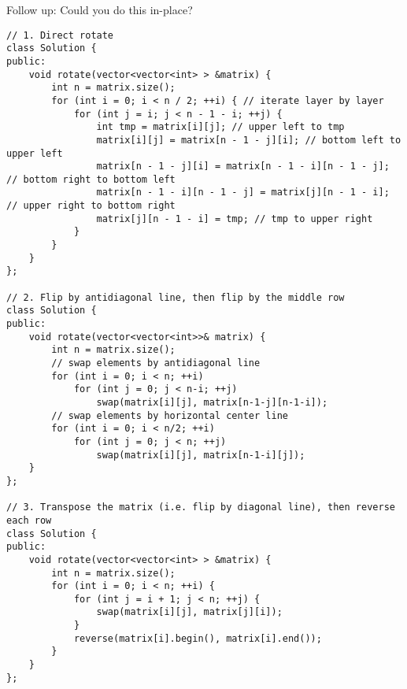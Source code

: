 Follow up: Could you do this in-place?\\

\begin{lstlisting}
// 1. Direct rotate
class Solution {
public:
    void rotate(vector<vector<int> > &matrix) {
        int n = matrix.size();
        for (int i = 0; i < n / 2; ++i) { // iterate layer by layer
            for (int j = i; j < n - 1 - i; ++j) {
                int tmp = matrix[i][j]; // upper left to tmp
                matrix[i][j] = matrix[n - 1 - j][i]; // bottom left to upper left
                matrix[n - 1 - j][i] = matrix[n - 1 - i][n - 1 - j]; // bottom right to bottom left
                matrix[n - 1 - i][n - 1 - j] = matrix[j][n - 1 - i]; // upper right to bottom right
                matrix[j][n - 1 - i] = tmp; // tmp to upper right
            }
        }
    }
};

// 2. Flip by antidiagonal line, then flip by the middle row
class Solution {
public:
    void rotate(vector<vector<int>>& matrix) {
        int n = matrix.size();
        // swap elements by antidiagonal line
        for (int i = 0; i < n; ++i)
            for (int j = 0; j < n-i; ++j)
                swap(matrix[i][j], matrix[n-1-j][n-1-i]);
        // swap elements by horizontal center line        
        for (int i = 0; i < n/2; ++i)
            for (int j = 0; j < n; ++j)
                swap(matrix[i][j], matrix[n-1-i][j]);
    }
};

// 3. Transpose the matrix (i.e. flip by diagonal line), then reverse each row
class Solution {
public:
    void rotate(vector<vector<int> > &matrix) {
        int n = matrix.size();
        for (int i = 0; i < n; ++i) {
            for (int j = i + 1; j < n; ++j) {
                swap(matrix[i][j], matrix[j][i]);
            }
            reverse(matrix[i].begin(), matrix[i].end());
        }
    }
};
\end{lstlisting}


